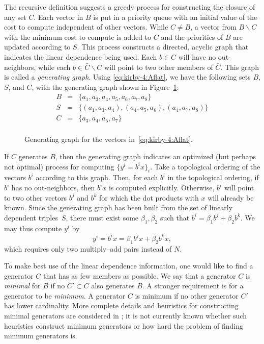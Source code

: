The recursive definition suggests a greedy process for constructing
the closure of any set $ C $. Each vector in $B$ is put in a priority
queue with an initial value of the cost to compute independent of other
vectors. While $C \ne B$, a vector from $B \backslash C$ with the
minimum cost to compute is added to $C$ and the priorities of $B$ are
updated according to $S$. This process constructs a directed, acyclic
graph that indicates the linear dependence being used. Each $ b \in C
$ will have no out-neighbors, while each $ b \in \bar{C} \backslash C
$ will point to two other members of $ \bar{C} $. This graph is
called a \emph{generating graph}. Using \eqref{eq:kirby-4:Aflat}, we
have the following sets $B$, $S$, and $C$, with the generating graph
shown in Figure~\ref{fig:kirby-4:gg}:
\begin{equation}
\begin{array}{rcl}
 B & = &  \{a_1, a_3, a_4, a_5, a_6, a_7, a_8\} \\
 S & = & \{(a_1, a_3, a_4),(a_4, a_5, a_6), (a_4, a_7, a_8)\} \\
 C & = & \{a_3, a_4, a_5, a_7\} \\
\end{array}
\end{equation}

\begin{figure}
  \center
  \caption{Generating graph for the vectors in~\eqref{eq:kirby-4:Aflat}.}
  \label{fig:kirby-4:gg}
\end{figure}

If $C$ generates $B$, then the generating graph indicates an optimized
(but perhaps not optimal) process for computing $\{ y^i = b^i x \}_i$.
Take a topological ordering of the vectors $b^i$ according to this
graph. Then, for each $b^i$ in the topological ordering, if $b^i$ has
no out-neighbors, then $b^i x$ is computed explicitly. Otherwise,
$b^i$ will point to two other vectors $b^j$ and $b^k$ for which the
dot products with $x$ will already be known. Since the generating
graph has been built from the set of linearly dependent triples~$S$,
there must exist some $\beta_1, \beta_2$ such that $b^i = \beta_1 b^j
+ \beta_2 b^k$. We may thus compute $y^i$ by
\begin{equation}
y^i = b^i x = \beta_1 b^j x
+ \beta_2  b^k  x,
\end{equation}
which requires only two multiply--add pairs instead of $ N $.

To make best use of the linear dependence information, one would like
to find a generator $C$ that has as few members as possible. We
say that a generator $C$ is \emph{minimal} for $B$ if no $C'
\subset C$ also generates $B$. A stronger requirement is for a
generator to be \emph{minimum}. A generator $C$ is minimum if no other
generator $C'$ has lower cardinality. More complete details and
heuristics for constructing minimal generators are considered
in \citet{KirbyScott2007}; it is not currently known whether such
heuristics construct minimum generators or how hard the problem of
finding minimum generators is.


